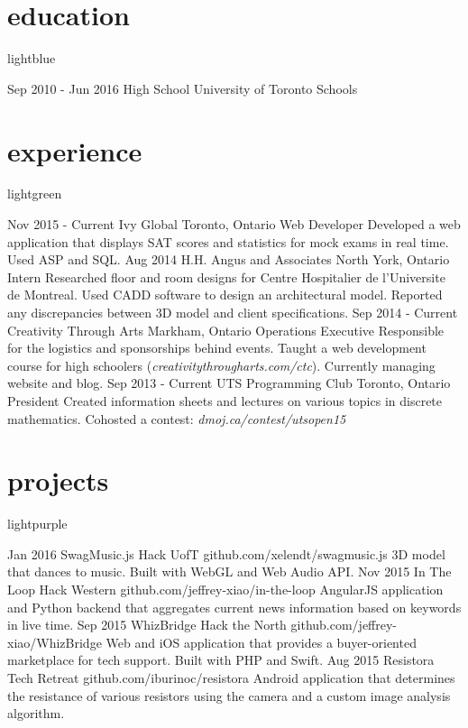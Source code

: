 \documentclass{resume}
\begin{document}
	\begin{main}
		\vspace{10pt}\section{education}{lightblue}
			\begin{entrylist}
				\rightentry%
				{Sep 2010 - Jun 2016}%
				{High School}%
				{University of Toronto Schools}%
				{}{}
			\end{entrylist}
		\section{experience}{lightgreen}
			\begin{entrylist}
				\rightentry%
					{Nov 2015 - Current}%
					{Ivy Global}%
					{Toronto, Ontario}%
					{Web Developer}%
					{Developed a web application that displays SAT scores and statistics for mock exams in real time. Used ASP and SQL.}
				\rightentry%
					{Aug 2014}%
					{H.H. Angus and Associates}%
					{North York, Ontario}%
					{Intern}%
					{Researched floor and room designs for Centre Hospitalier de l'Universite de Montreal. Used CADD software to design an architectural model. Reported any discrepancies between 3D model and client specifications.}
				\rightentry%
					{Sep 2014 - Current}%
					{Creativity Through Arts}%
					{Markham, Ontario}%
					{Operations Executive}%
					{Responsible for the logistics and sponsorships behind events. Taught a web development course for high schoolers (\emph{creativitythrougharts.com/ctc}). Currently managing website and blog.}
				\rightentry%
					{Sep 2013 - Current}%
					{UTS Programming Club}%
					{Toronto, Ontario}%
					{President}%
					{Created information sheets and lectures on various topics in discrete mathematics. Cohosted a contest: \emph{dmoj.ca/contest/utsopen15}}
			\end{entrylist}
		\section{projects}{lightpurple}
			\begin{entrylist}
				\rightentry%
					{Jan 2016}%
					{SwagMusic.js}%
					{Hack UofT}%
					{github.com/xelendt/swagmusic.js}%
					{3D model that dances to music. Built with WebGL and Web Audio API.}
				\rightentry%
					{Nov 2015}%
					{In The Loop}%
					{Hack Western}%
					{github.com/jeffrey-xiao/in-the-loop}%
					{AngularJS application and Python backend that aggregates current news information based on keywords in live time.}
				\rightentry%
					{Sep 2015}%
					{WhizBridge}%
					{Hack the North}%
					{github.com/jeffrey-xiao/WhizBridge}%
					{Web and iOS application that provides a buyer-oriented marketplace for tech support. Built with PHP and Swift.}
				\rightentry%
					{Aug 2015}%
					{Resistora}%
					{Tech Retreat}%
					{github.com/iburinoc/resistora}%
					{Android application that determines the resistance of various resistors using the camera and a custom image analysis algorithm.}
			\end{entrylist}	
	\end{main}
\end{document}
